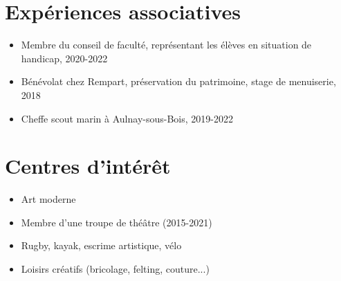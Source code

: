\documentclass[a4paper,12pt]{article}
\begin{document}

\begin{minipage}[t]{0.49\linewidth}
\section*{Expériences associatives}
\begin{itemize}[leftmargin=*, nosep, itemsep=3pt]
    \item Membre du conseil de faculté, représentant les élèves en situation de handicap, 2020-2022
    \item Bénévolat chez Rempart, préservation du patrimoine, stage de menuiserie, 2018
    \item Cheffe scout marin à Aulnay-sous-Bois, 2019-2022
\end{itemize}
\end{minipage}\hfill
\begin{minipage}[t]{0.49\linewidth}
\section*{Centres d'intérêt}
\begin{itemize}[leftmargin=*, nosep, itemsep=3pt]
    \item Art moderne
    \item Membre d'une troupe de théâtre (2015-2021)
    \item Rugby, kayak, escrime artistique, vélo
    \item Loisirs créatifs (bricolage, felting, couture...)
\end{itemize}
\end{minipage}


\vfill
\end{document}
